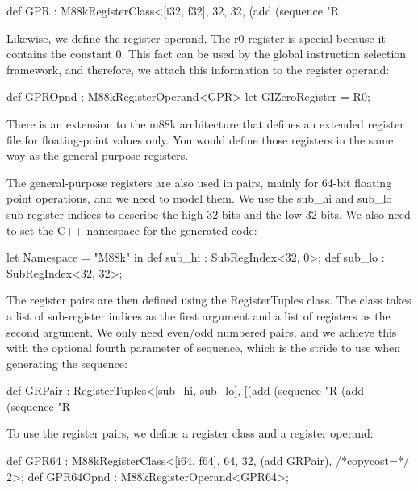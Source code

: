 \begin{cpp}
def GPR : M88kRegisterClass<[i32, f32], 32, 32,
                            (add (sequence "R%
\end{cpp}

Likewise, we define the register operand. The r0 register is special because it contains the constant 0. This fact can be used by the global instruction selection framework, and therefore, we attach this information to the register operand:

\begin{cpp}
def GPROpnd : M88kRegisterOperand<GPR> {
    let GIZeroRegister = R0;
}
\end{cpp}

There is an extension to the m88k architecture that defines an extended register file for floating-point values only. You would define those registers in the same way as the general-purpose registers.

The general-purpose registers are also used in pairs, mainly for 64-bit floating point operations, and we need to model them. We use the sub\_hi and sub\_lo sub-register indices to describe the high 32 bits and the low 32 bits. We also need to set the C++ namespace for the generated code:

\begin{cpp}
let Namespace = "M88k" in {
    def sub_hi : SubRegIndex<32, 0>;
    def sub_lo : SubRegIndex<32, 32>;
}
\end{cpp}

The register pairs are then defined using the RegisterTuples class. The class takes a list of sub-register indices as the first argument and a list of registers as the second argument. We only need even/odd numbered pairs, and we achieve this with the optional fourth parameter of sequence, which is the stride to use when generating the sequence:

\begin{cpp}
def GRPair : RegisterTuples<[sub_hi, sub_lo],
                            [(add (sequence "R%
                            (add (sequence "R%
\end{cpp}

To use the register pairs, we define a register class and a register operand:

\begin{cpp}
def GPR64 : M88kRegisterClass<[i64, f64], 64, 32,
                              (add GRPair), /*copycost=*/ 2>;
def GPR64Opnd : M88kRegisterOperand<GPR64>;
\end{cpp}

